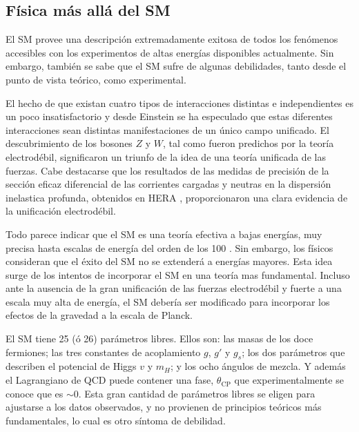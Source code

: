 \subsection{Física más allá del SM}

El SM provee una descripción extremadamente exitosa de todos los fenómenos
accesibles con los experimentos de altas energías disponibles actualmente.
Sin embargo,
también se sabe que el SM sufre de algunas debilidades, tanto desde el punto de
vista teórico, como experimental.

El hecho de que existan cuatro tipos de interacciones distintas e independientes
es un poco insatisfactorio y desde Einstein se ha especulado que estas
diferentes interacciones sean distintas manifestaciones de un único campo
unificado. El descubrimiento de los bosones $Z$ y $W$, tal como fueron predichos
por la teoría electrodébil, significaron un triunfo de la idea de una teoría unificada de las
fuerzas. Cabe destacarse que los resultados de las medidas de precisión de la sección
eficaz diferencial de las corrientes cargadas y neutras en la dispersión inelastica
profunda, obtenidos en HERA \cite{Hera}, proporcionaron una clara evidencia de la unificación
electrodébil.

Todo parece indicar que el SM es una teoría efectiva a bajas energías, muy precisa hasta
escalas de energía del orden de los 100 {\gev}. Sin embargo, los físicos
consideran que el éxito del SM no se extenderá a energías mayores. Esta
idea surge de los intentos de incorporar el SM en una teoría mas
fundamental. Incluso ante la ausencia de la gran unificación de las fuerzas
electrodébil y fuerte a una escala muy alta de energía, el SM debería ser
modificado para incorporar los efectos de la gravedad a la escala de Planck.

El SM tiene 25 (ó 26) parámetros libres. Ellos son: las masas de los doce fermiones;
las tres constantes de acoplamiento $g$, $g'$ y $g_s$; los dos parámetros que
describen el potencial de Higgs $v$ y $m_H$; y los ocho ángulos de mezcla. Y
además el Lagrangiano de QCD puede contener una fase, $\theta_{\text{CP}}$ que
experimentalmente se conoce que es $\sim 0$. Esta gran cantidad de parámetros
libres se eligen para ajustarse a los datos observados, y no provienen de
principios teóricos más fundamentales, lo cual es otro síntoma de debilidad.

